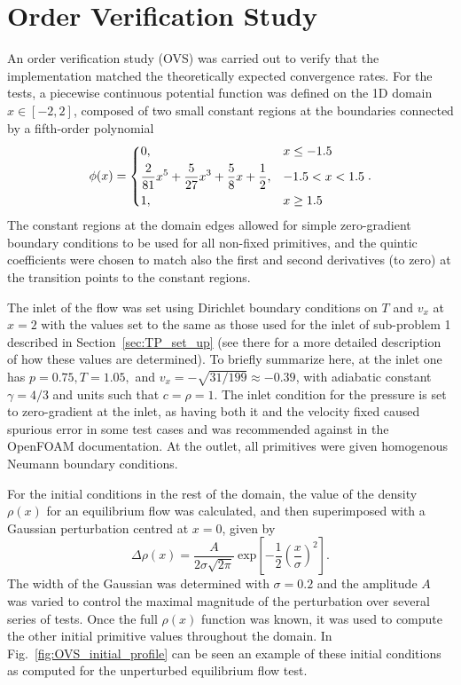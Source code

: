 \section{Order Verification Study}
\label{sec:OVS}

An order verification study (OVS) was carried out to verify that the implementation matched the theoretically expected convergence rates. For the tests, a piecewise continuous potential function was defined on the 1D domain $x\in[-2,2]$, composed of two small constant regions at the boundaries connected by a fifth-order polynomial
\begin{equation}
\phi(x)=
\begin{dcases} 
0, & x\leq -1.5 \\
\frac{2}{81}x^5+\frac{5}{27}x^3+\frac{5}{8}x+\frac{1}{2}, & -1.5<x<1.5 \\
1, & x\geq 1.5
\end{dcases}.
\end{equation}
The constant regions at the domain edges allowed for simple zero-gradient boundary conditions to be used for all non-fixed primitives, and the quintic coefficients were chosen to match also the first and second derivatives (to zero) at the transition points to the constant regions.

The inlet of the flow was set using Dirichlet boundary conditions on $T$ and $v_x$ at $x=2$ with the values set to the same as those used for the inlet of sub-problem 1 described in Section~\ref{sec:TP_set_up} (see there for a more detailed description of how these values are determined). To briefly summarize here, at the inlet one has $p=0.75, T=1.05,$ and $v_x=-\sqrt{31/199}\approx-0.39$, with adiabatic constant $\gamma=4/3$ and units such that $c=\rho=1$. The inlet condition for the pressure is set to zero-gradient at the inlet, as having both it and the velocity fixed caused spurious error in some test cases and was recommended against in the OpenFOAM documentation. At the outlet, all primitives were given homogenous Neumann boundary conditions.

For the initial conditions in the rest of the domain, the value of the density $\rho(x)$ for an equilibrium flow was calculated, and then superimposed with a Gaussian perturbation centred at $x=0$, given by
\begin{equation}
\Delta \rho(x)=\frac{A}{2\sigma \sqrt{2 \pi}}\ \textrm{exp}\left[-\frac{1}{2}\left(\frac{x}{\sigma}\right)^2\right].
\end{equation}
The width of the Gaussian was determined with $\sigma=0.2$ and the amplitude $A$ was varied to control the maximal magnitude of the perturbation over several series of tests. Once the full $\rho(x)$ function was known, it was used to compute the other initial primitive values throughout the domain. In Fig.~\ref{fig:OVS_initial_profile} can be seen an example of these initial conditions as computed for the unperturbed equilibrium flow test.

